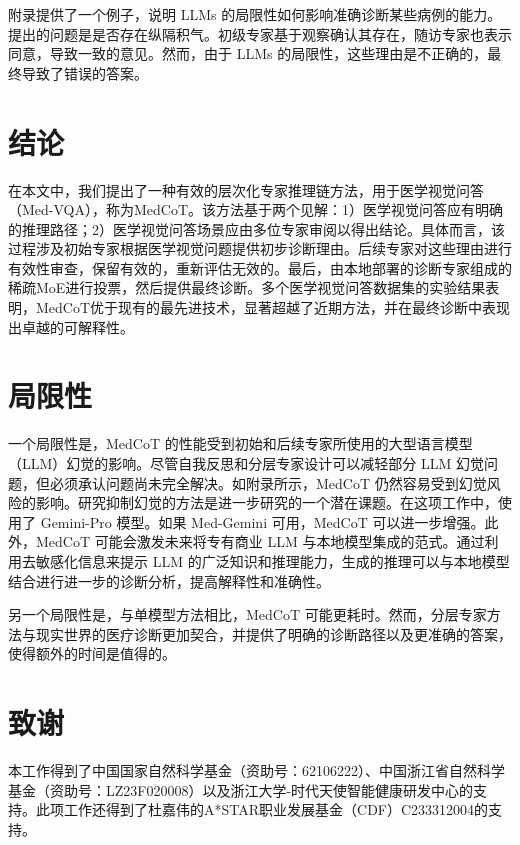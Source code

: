 \documentclass[11pt]{article}
\begin{document}
附录提供了一个例子，说明 LLMs 的局限性如何影响准确诊断某些病例的能力。提出的问题是是否存在纵隔积气。初级专家基于观察确认其存在，随访专家也表示同意，导致一致的意见。然而，由于 LLMs 的局限性，这些理由是不正确的，最终导致了错误的答案。
\section{结论}
在本文中，我们提出了一种有效的层次化专家推理链方法，用于医学视觉问答（Med-VQA），称为MedCoT。该方法基于两个见解：1）医学视觉问答应有明确的推理路径；2）医学视觉问答场景应由多位专家审阅以得出结论。具体而言，该过程涉及初始专家根据医学视觉问题提供初步诊断理由。后续专家对这些理由进行有效性审查，保留有效的，重新评估无效的。最后，由本地部署的诊断专家组成的稀疏MoE进行投票，然后提供最终诊断。多个医学视觉问答数据集的实验结果表明，MedCoT优于现有的最先进技术，显著超越了近期方法，并在最终诊断中表现出卓越的可解释性。

\newpage
\section*{局限性}
一个局限性是，MedCoT 的性能受到初始和后续专家所使用的大型语言模型（LLM）幻觉的影响。尽管自我反思和分层专家设计可以减轻部分 LLM 幻觉问题，但必须承认问题尚未完全解决。如附录所示，MedCoT 仍然容易受到幻觉风险的影响。研究抑制幻觉的方法是进一步研究的一个潜在课题。在这项工作中，使用了 Gemini-Pro 模型。如果 Med-Gemini 可用，MedCoT 可以进一步增强。此外，MedCoT 可能会激发未来将专有商业 LLM 与本地模型集成的范式。通过利用去敏感化信息来提示 LLM 的广泛知识和推理能力，生成的推理可以与本地模型结合进行进一步的诊断分析，提高解释性和准确性。

另一个局限性是，与单模型方法相比，MedCoT 可能更耗时。然而，分层专家方法与现实世界的医疗诊断更加契合，并提供了明确的诊断路径以及更准确的答案，使得额外的时间是值得的。
\section*{致谢}
本工作得到了中国国家自然科学基金（资助号：62106222）、中国浙江省自然科学基金（资助号：LZ23F020008）以及浙江大学-时代天使智能健康研发中心的支持。此项工作还得到了杜嘉伟的A*STAR职业发展基金（CDF）C233312004的支持。


\newpage
\end{document}

